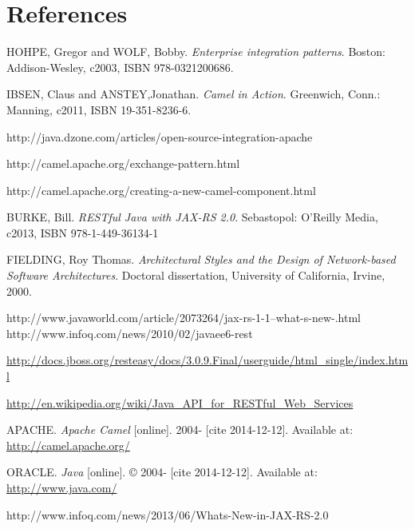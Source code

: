 \documentclass[12pt,final,oneside]{fithesis2}
\begin{document}
\chapter{References}
\renewcommand{\chapter}[2]{}%




\begin{thebibliography}{}
 HOHPE, Gregor and WOLF, Bobby. \textit{Enterprise integration patterns}. Boston: Addison-Wesley, c2003, ISBN 978-0321200686.

 IBSEN, Claus and ANSTEY,Jonathan. \textit{Camel in Action}. Greenwich, Conn.: Manning, c2011, ISBN 19-351-8236-6.

 http://java.dzone.com/articles/open-source-integration-apache

 http://camel.apache.org/exchange-pattern.html

 http://camel.apache.org/creating-a-new-camel-component.html

 BURKE, Bill. \textit{RESTful Java with JAX-RS 2.0}. Sebastopol: O'Reilly Media, c2013, ISBN 978-1-449-36134-1

 FIELDING, Roy Thomas. \textit{Architectural Styles and the Design of Network-based Software Architectures}. Doctoral dissertation, University of California, Irvine, 2000. 

 http://www.javaworld.com/article/2073264/jax-rs-1-1--what-s-new-.html
 http://www.infoq.com/news/2010/02/javaee6-rest

\url{http://docs.jboss.org/resteasy/docs/3.0.9.Final/userguide/html_single/index.html}

 \url{http://en.wikipedia.org/wiki/Java_API_for_RESTful_Web_Services}

 APACHE. \textit{Apache Camel} [online]. 2004- [cite 2014-12-12]. Available at: \url{http://camel.apache.org/}

 ORACLE. \textit{Java} [online]. \copyright{} 2004- [cite 2014-12-12]. Available at: \url{http://www.java.com/}		

 http://www.infoq.com/news/2013/06/Whats-New-in-JAX-RS-2.0


\end{thebibliography}
\end{document}
